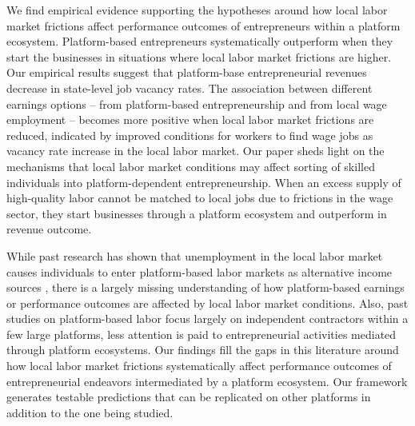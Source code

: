 \documentclass[letterpaper,12pt]{article}
\begin{document}
We find empirical evidence supporting the hypotheses around how local labor market frictions affect performance outcomes of entrepreneurs within a platform ecosystem. Platform-based entrepreneurs systematically outperform when they start the businesses in situations where local labor market frictions are higher. Our empirical results suggest that platform-base entrepreneurial revenues decrease in state-level job vacancy rates. The association between different earnings options – from platform-based entrepreneurship and from local wage employment – becomes more positive when local labor market frictions are reduced, indicated by improved conditions for workers to find wage jobs as vacancy rate increase in the local labor market. Our paper sheds light on the mechanisms that local labor market conditions may affect sorting of skilled individuals into platform-dependent entrepreneurship. When an excess supply of high-quality labor cannot be matched to local jobs due to frictions in the wage sector, they start businesses through a platform ecosystem and outperform in revenue outcome.

While past research has shown that unemployment in the local labor market causes individuals to enter platform-based labor markets as alternative income sources \citep{burtch_can_2018,huang_unemployment_2020,jackson_availability_2022,laitenberger2023unemployment}, there is a largely missing understanding of how platform-based earnings or performance outcomes are affected by local labor market conditions. Also, past studies on platform-based labor focus largely on independent contractors within a few large platforms, less attention is paid to entrepreneurial activities mediated through platform ecosystems. Our findings fill the gaps in this literature around how local labor market frictions systematically affect performance outcomes of entrepreneurial endeavors intermediated by a platform ecosystem. Our framework generates testable predictions that can be replicated on other platforms in addition to the one being studied.
\end{document}
